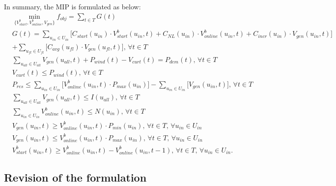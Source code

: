 \documentclass{article}
\begin{document}
In summary, the MIP is formulated as below: 
{\small
\begin{align}
    & \min_{\{ V_{start}^b,V_{online}^b,V_{gen} \}} f_{obj} = \sum_{t \in T} G(t) \\
    & G(t) = \sum_{u_{in} \in  U_{in}} 
             \Big[ 
             C_{start}(u_{in}) \cdot V_{start}^b(u_{in}, t) + C_{NL}(u_{in}) \cdot V_{online}^b(u_{in}, t) + C_{incr}(u_{in}) \cdot V_{gen}(u_{in}, t)  \Big] \nonumber \\
             & + \sum_{u_{fl} \in  U_{fl}}
             \Big[ 
             C_{avg}(u_{fl}) \cdot V_{gen}(u_{fl}, t) 
             \Big] \text{, } \forall t \in T \\
    & \sum_{u_{all} \in U_{all}} V_{gen}(u_{all},t) + P_{wind}(t) - V_{curt}(t) = P_{dem}(t) \text{, } \forall t \in T \\
    & V_{curt}(t) \leq P_{wind}(t) \text{, } \forall t \in T \\
    & P_{res} \leq \sum_{u_{in} \in U_{in}} \Big[ V_{online}^b(u_{in},t) \cdot P_{max}(u_{in}) \Big] - \sum_{u_{in} \in U_{in}} \Big[ V_{gen}(u_{in},t) \Big] \text{, } \forall t \in T \\
    & \sum_{u_{all} \in U_{all}} V_{gen}(u_{all}, t) \leq I(u_{all}) \text{, } \forall t \in T \\
    & \sum_{u_{in} \in U_{in}} V_{online}^b(u_{in}, t) \leq N(u_{in}) \text{, } \forall t \in T \\
    & V_{gen}(u_{in},t) \geq V_{online}^b(u_{in},t) \cdot P_{min}(u_{in}) \text{, } \forall t \in T \text{, } \forall u_{in} \in U_{in} \\
    & V_{gen}(u_{in},t) \leq V_{online}^b(u_{in},t) \cdot P_{max}(u_{in}) \text{, } \forall t \in T \text{, } \forall u_{in} \in U_{in} \\
    & V_{start}^b(u_{in},t) \geq V_{online}^b(u_{in},t) - V_{online}^b(u_{in},t-1 ) \text{, } \forall t \in T \text{, } \forall u_{in} \in U_{in}.
\end{align}
}

\subsection{Revision of the formulation}

\renewcommand{\arraystretch}{1.8}
\end{document}
